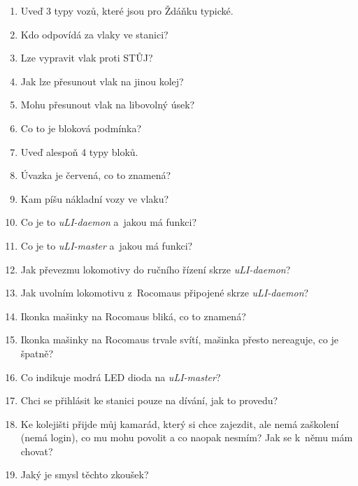 \documentclass[12pt,a4paper]{article}
\begin{document}
\begin{enumerate}[leftmargin=*]
\item Uveď 3 typy vozů, které jsou pro Ždáňku typické.

\item Kdo odpovídá za vlaky ve stanici?

\item Lze vypravit vlak proti STŮJ?

\item Jak lze přesunout vlak na jinou kolej?

\item Mohu přesunout vlak na libovolný úsek?

\item Co to je bloková podmínka?

\item Uveď alespoň 4 typy bloků.

\item Úvazka je červená, co to znamená?

\item Kam píšu nákladní vozy ve vlaku?

\item Co je to \textit{uLI-daemon} a~jakou má funkci?

\item Co je to \textit{uLI-master} a~jakou má funkci?

\item Jak převezmu lokomotivy do ručního řízení skrze \textit{uLI-daemon}?

\item Jak uvolním lokomotivu z~Rocomaus připojené skrze \textit{uLI-daemon}?

\item Ikonka mašinky na Rocomaus bliká, co to znamená?

\item Ikonka mašinky na Rocomaus trvale svítí, mašinka přesto nereaguje, co je
špatně?

\item Co indikuje modrá LED dioda na \textit{uLI-master}?

\item Chci se přihlásit ke stanici pouze na dívání, jak to provedu?

\item Ke kolejišti přijde můj kamarád, který si chce zajezdit, ale nemá
zaškolení (nemá login), co mu mohu povolit a co naopak nesmím? Jak se k~němu
mám chovat?

\item Jaký je smysl těchto zkoušek?

\end{enumerate}
\end{document}

